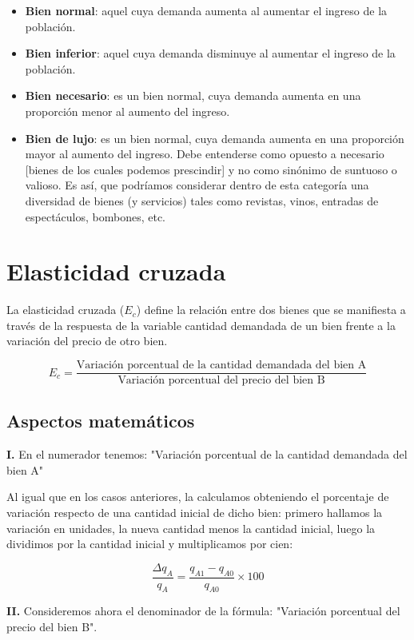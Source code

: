 \documentclass[12pt,a4paper]{article}
\begin{document}
\begin{itemize}
\item \textbf{Bien normal}: aquel cuya demanda aumenta al aumentar el ingreso de la población.
\item \textbf{Bien inferior}: aquel cuya demanda disminuye al aumentar el ingreso de la población.
\item \textbf{Bien necesario}: es un bien normal, cuya demanda aumenta en una proporción menor al aumento del ingreso.
\item \textbf{Bien de lujo}: es un bien normal, cuya demanda aumenta en una proporción mayor al aumento del ingreso. Debe entenderse como opuesto a necesario [bienes de los cuales podemos prescindir] y no como sinónimo de suntuoso o valioso. Es así, que podríamos considerar dentro de esta categoría una diversidad de bienes (y servicios) tales como revistas, vinos, entradas de espectáculos, bombones, etc.
\end{itemize}

\section{Elasticidad cruzada}

La elasticidad cruzada ($E_c$) define la relación entre dos bienes que se manifiesta a través de la respuesta de la variable cantidad demandada de un bien frente a la variación del precio de otro bien.

\[
E_c = \frac{\text{Variación porcentual de la cantidad demandada del bien A}}{\text{Variación porcentual del precio del bien B}}
\]

\subsection{Aspectos matemáticos}

\textbf{I.} En el numerador tenemos: "Variación porcentual de la cantidad demandada del bien A"

Al igual que en los casos anteriores, la calculamos obteniendo el porcentaje de variación respecto de una cantidad inicial de dicho bien: primero hallamos la variación en unidades, la nueva cantidad menos la cantidad inicial, luego la dividimos por la cantidad inicial y multiplicamos por cien:

\[
\frac{\Delta q_A}{q_A} = \frac{q_{A1} - q_{A0}}{q_{A0}} \times 100
\]

\textbf{II.} Consideremos ahora el denominador de la fórmula: "Variación porcentual del precio del bien B".
\end{document}
